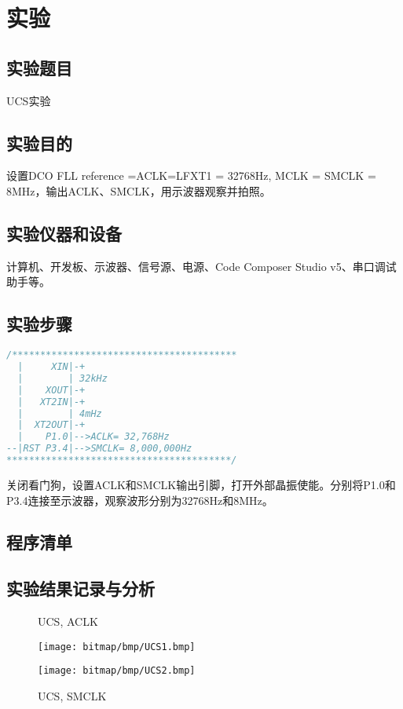 \section{实验}
\subsection{实验题目}
UCS实验
\subsection{实验目的}
设置DCO FLL reference =ACLK=LFXT1 = 32768Hz, MCLK = SMCLK = 8MHz，输出ACLK、SMCLK，用示波器观察并拍照。
\subsection{实验仪器和设备}
计算机、开发板、示波器、信号源、电源、Code Composer Studio v5、串口调试助手等。
\subsection{实验步骤}
\begin{lstlisting}[language=C]
/****************************************
  |     XIN|-+
  |        | 32kHz
  |    XOUT|-+
  |   XT2IN|-+
  |        | 4mHz
  |  XT2OUT|-+
  |    P1.0|-->ACLK= 32,768Hz
--|RST P3.4|-->SMCLK= 8,000,000Hz
****************************************/
\end{lstlisting}
\par\indent 关闭看门狗，设置ACLK和SMCLK输出引脚，打开外部晶振使能。分别将P1.0和P3.4连接至示波器，观察波形分别为32768Hz和8MHz。
\subsection{程序清单}

\clearpage
\subsection{实验结果记录与分析}
\begin{figure}[htbp]
	\centering
	\begin{minipage}[htbp]{7.5cm}
		\centering
		\caption{UCS, ACLK}
		\label{UCS1}
		\texttt{[image: bitmap/bmp/UCS1.bmp]}
	\end{minipage}
	\begin{minipage}[htbp]{7.5cm}
		\centering
		\caption{UCS, SMCLK}
		\label{UCS2}
		\texttt{[image: bitmap/bmp/UCS2.bmp]}
	\end{minipage}
\end{figure}
